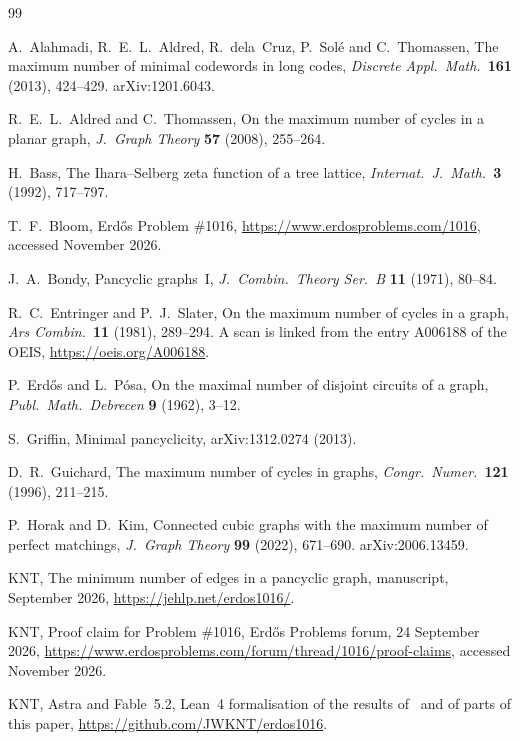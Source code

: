 \begin{thebibliography}{99}\small

 A.~Alahmadi, R.~E.~L.~Aldred, R.~dela~Cruz, P.~Sol\'e and C.~Thomassen, The maximum
number of minimal codewords in long codes, \emph{Discrete Appl.\ Math.}\ \textbf{161} (2013),
424--429. arXiv:1201.6043.

 R.~E.~L.~Aldred and C.~Thomassen, On the maximum number of cycles in a planar graph,
\emph{J.~Graph Theory} \textbf{57} (2008), 255--264.

 H.~Bass, The Ihara--Selberg zeta function of a tree lattice, \emph{Internat.\
J.~Math.}\ \textbf{3} (1992), 717--797.

 T.~F.~Bloom, Erd\H{o}s Problem \#1016, \url{https://www.erdosproblems.com/1016},
accessed November 2026.

 J.~A.~Bondy, Pancyclic graphs~I, \emph{J.~Combin.\ Theory Ser.~B} \textbf{11}
(1971), 80--84.

 R.~C.~Entringer and P.~J.~Slater, On the maximum number of cycles in a graph,
\emph{Ars Combin.}\ \textbf{11} (1981), 289--294. A scan is linked from the entry A006188 of the
OEIS, \url{https://oeis.org/A006188}.

 P.~Erd\H{o}s and L.~P\'osa, On the maximal number of disjoint circuits of a graph,
\emph{Publ.\ Math.\ Debrecen} \textbf{9} (1962), 3--12.

 S.~Griffin, Minimal pancyclicity, arXiv:1312.0274 (2013).

 D.~R.~Guichard, The maximum number of cycles in graphs, \emph{Congr.\ Numer.}\
\textbf{121} (1996), 211--215.

 P.~Horak and D.~Kim, Connected cubic graphs with the maximum number of perfect
matchings, \emph{J.~Graph Theory} \textbf{99} (2022), 671--690. arXiv:2006.13459.

\bibitem{KNT} KNT, The minimum number of edges in a pancyclic graph, manuscript, September 2026,
\url{https://jehlp.net/erdos1016/}.

 KNT, Proof claim for Problem \#1016, Erd\H{o}s Problems forum, 24 September 2026,
\url{https://www.erdosproblems.com/forum/thread/1016/proof-claims}, accessed November 2026.

\bibitem{Repo} KNT, Astra and Fable~5.2, Lean~4 formalisation of the results of~\cite{KNT} and of
parts of this paper, \url{https://github.com/JWKNT/erdos1016}.


\end{thebibliography}
